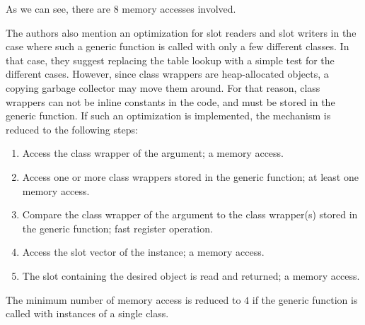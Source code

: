 As we can see, there are $8$ memory accesses involved. 

The authors also mention an optimization for slot readers and slot
writers in the case where such a generic function is called with only
a few different classes.  In that case, they suggest replacing the
table lookup with a simple test for the different cases.  However,
since class wrappers are heap-allocated objects, a copying garbage
collector may move them around.  For that reason, class wrappers can
not be inline constants in the code, and must be stored in the generic
function.  If such an optimization is implemented, the mechanism is
reduced to the following steps:

\begin{enumerate}
\item Access the class wrapper of the argument; a memory access.
\item Access one or more class wrappers stored in the generic
  function; at least one memory access.
\item Compare the class wrapper of the argument to the class
  wrapper(s) stored in the generic function; fast register operation.
\item Access the slot vector of the instance; a memory access.
\item The slot containing the desired object is read and returned; a
  memory access.
\end{enumerate}

The minimum number of memory access is reduced to $4$ if the generic
function is called with instances of a single class.  
